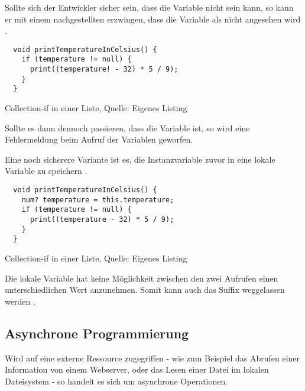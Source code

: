 Sollte sich der Entwickler sicher sein, dass die Variable nicht  sein kann, so kann er mit einem nachgestellten \IC{!} erzwingen, dass die Variable als nicht  angesehen wird .

\ifIncludeFigures
  \begin{listing}[ht]
    \begin{verbatim}
  void printTemperatureInCelsius() {
    if (temperature != null) {
      print((temperature! - 32) * 5 / 9);
    }
  }
    \end{verbatim}
    \caption[Collection-if in einer Liste]{Collection-if in einer Liste, Quelle: Eigenes Listing}
    \label{lst:printTemperatureInCelsiusLocalVariableForceNullCheck}
  \end{listing}
\fi

Sollte es dann dennoch passieren, dass die Variable  ist, so wird eine Fehlermeldung beim Aufruf der Variablen geworfen.



Eine noch sicherere Variante ist es, die Instanzvariable zuvor in eine lokale Variable zu speichern .


\ifIncludeFigures
  \begin{listing}[ht]
    \begin{verbatim}
  void printTemperatureInCelsius() {
    num? temperature = this.temperature;
    if (temperature != null) {
      print((temperature - 32) * 5 / 9);
    }
  }
    \end{verbatim}
    \caption[Collection-if in einer Liste]{Collection-if in einer Liste, Quelle: Eigenes Listing}
    \label{lst:printTemperatureInCelsiusLocalVariable}
  \end{listing}
\fi

Die lokale Variable hat keine Möglichkeit zwischen den zwei Aufrufen einen unterschiedlichen Wert anzunehmen.
Somit kann auch das Suffix \IC{!} weggelassen werden .



\subsection{Asynchrone Programmierung}

Wird auf eine externe Ressource zugegriffen - wie zum Beispiel das Abrufen einer Information von einem Webserver, oder das Lesen einer Datei im lokalen Dateisystem - so handelt es sich um asynchrone Operationen.

